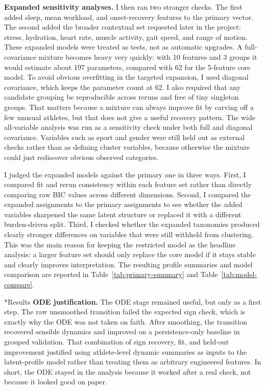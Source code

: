 \documentclass[11pt]{article}
\makeatletter
\renewcommand\section{\@startsection{section}{1}{0pt}{0.38em}{0.14em}{\bfseries\normalsize}}
\makeatother
\begin{document}
\textbf{Expanded sensitivity analyses.}
I then ran two stronger checks. The first added sleep, mean workload, and onset-recovery features to the primary vector. The second added the broader contextual set requested later in the project: stress, hydration, heart rate, muscle activity, gait speed, and range of motion. These expanded models were treated as tests, not as automatic upgrades. A full-covariance mixture becomes heavy very quickly: with 10 features and 3 groups it would estimate about 197 parameters, compared with 62 for the 5-feature core model. To avoid obvious overfitting in the targeted expansion, I used diagonal covariance, which keeps the parameter count at 62. I also required that any candidate grouping be reproducible across reruns and free of tiny singleton groups. That matters because a mixture can always improve fit by carving off a few unusual athletes, but that does not give a useful recovery pattern. The wide all-variable analysis was run as a sensitivity check under both full and diagonal covariance. Variables such as sport and gender were still held out as external checks rather than as defining cluster variables, because otherwise the mixture could just rediscover obvious observed categories.

I judged the expanded models against the primary one in three ways. First, I compared fit and rerun consistency within each feature set rather than directly comparing raw BIC values across different dimensions. Second, I compared the expanded assignments to the primary assignments to see whether the added variables sharpened the same latent structure or replaced it with a different burden-driven split. Third, I checked whether the expanded taxonomies produced clearly stronger differences on variables that were still withheld from clustering. This was the main reason for keeping the restricted model as the headline analysis: a larger feature set should only replace the core model if it stays stable and clearly improves interpretation. The resulting profile summaries and model comparison are reported in Table~\ref{tab:primary-summary} and Table~\ref{tab:model-compare}.

\section*{Results}
\textbf{ODE justification.}
The ODE stage remained useful, but only as a first step. The raw unsmoothed transition failed the expected sign check, which is exactly why the ODE was not taken on faith. After smoothing, the transition recovered sensible dynamics and improved on a persistence-only baseline in grouped validation. That combination of sign recovery, fit, and held-out improvement justified using athlete-level dynamic summaries as inputs to the latent-profile model rather than treating them as arbitrary engineered features. In short, the ODE stayed in the analysis because it worked after a real check, not because it looked good on paper.
\end{document}
